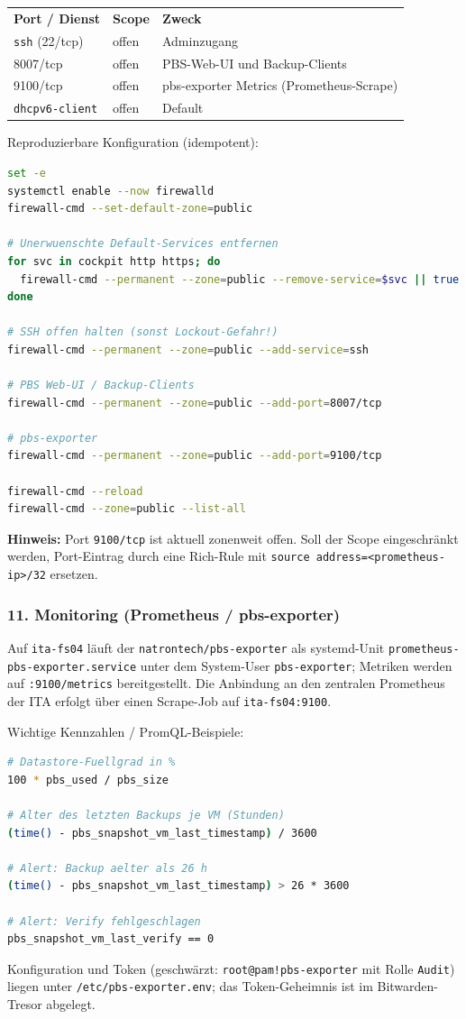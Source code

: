 \begin{tabular}{lll}
\rowcolor{heading}\textbf{Port / Dienst} & \textbf{Scope} & \textbf{Zweck} \\
\texttt{ssh} (22/tcp) & offen & Adminzugang \\
\rowcolor{odd}8007/tcp & offen & \ac{PBS}-Web-UI und Backup-Clients \\
9100/tcp & offen & pbs-exporter Metrics (Prometheus-Scrape) \\
\rowcolor{odd}\texttt{dhcpv6-client} & offen & Default \\
\end{tabular}

Reproduzierbare Konfiguration (idempotent):
\begin{lstlisting}[language=bash,caption={Firewall-Endzustand setzen}]
set -e
systemctl enable --now firewalld
firewall-cmd --set-default-zone=public

# Unerwuenschte Default-Services entfernen
for svc in cockpit http https; do
  firewall-cmd --permanent --zone=public --remove-service=$svc || true
done

# SSH offen halten (sonst Lockout-Gefahr!)
firewall-cmd --permanent --zone=public --add-service=ssh

# PBS Web-UI / Backup-Clients
firewall-cmd --permanent --zone=public --add-port=8007/tcp

# pbs-exporter
firewall-cmd --permanent --zone=public --add-port=9100/tcp

firewall-cmd --reload
firewall-cmd --zone=public --list-all
\end{lstlisting}

\noindent\textbf{Hinweis:} Port \texttt{9100/tcp} ist aktuell
zonenweit offen. Soll der Scope eingeschränkt werden, Port-Eintrag
durch eine Rich-Rule mit \texttt{source address=<prometheus-ip>/32}
ersetzen.

\subsubsection*{11. Monitoring (Prometheus / pbs-exporter)}
Auf \texttt{ita-fs04} läuft der \texttt{natrontech/pbs-exporter}
als systemd-Unit \texttt{prometheus-pbs-exporter.service} unter dem
System-User \texttt{pbs-exporter}; Metriken werden auf
\texttt{:9100/metrics} bereitgestellt. Die Anbindung an den
zentralen Prometheus der \ac{ITA} erfolgt über einen
Scrape-Job auf \texttt{ita-fs04:9100}.

Wichtige Kennzahlen / PromQL-Beispiele:
\begin{lstlisting}[language=bash,caption={Nuetzliche PromQL-Queries}]
# Datastore-Fuellgrad in %
100 * pbs_used / pbs_size

# Alter des letzten Backups je VM (Stunden)
(time() - pbs_snapshot_vm_last_timestamp) / 3600

# Alert: Backup aelter als 26 h
(time() - pbs_snapshot_vm_last_timestamp) > 26 * 3600

# Alert: Verify fehlgeschlagen
pbs_snapshot_vm_last_verify == 0
\end{lstlisting}
Konfiguration und Token (geschwärzt: \texttt{root@pam!pbs-exporter}
mit Rolle \texttt{Audit}) liegen unter
\texttt{/etc/pbs-exporter.env}; das Token-Geheimnis ist im
Bitwarden-Tresor abgelegt.

